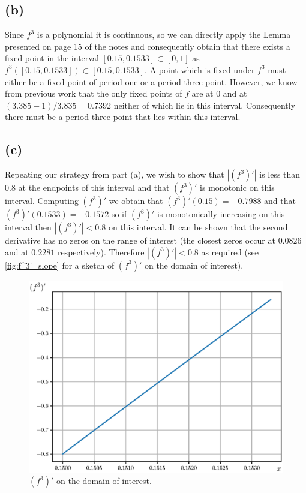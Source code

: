 \documentclass{article}
\begin{document}
\subsection*{(b)}
Since $f^3$ is a polynomial it is continuous, so we can directly apply the Lemma presented on 
page 15 of the notes and consequently obtain that there exists a fixed point in the interval 
$[0.15,0.1533] \subset [0,1]$ as $f^3([0.15,0.1533]) \subset [0.15,0.1533]$. A point which is 
fixed under $f^3$ must either be a fixed point of period one or a period three point. However, 
we know from previous work that the only fixed points of $f$ are at 0 and at $(3.385-1)/3.835 = 0.7392$ 
neither of which lie in this interval. Consequently there must be a period three point that lies 
within this interval.

\subsection*{(c)}
Repeating our strategy from part (a), we wish to show that $|(f^3)'|$ is less than 0.8 at the endpoints 
of this interval and that $(f^3)'$ is monotonic on this interval. Computing $(f^3)'$ we obtain that  
$(f^3)'(0.15) = -0.7988$ and that $(f^3)'(0.1533) = -0.1572$ so if $(f^3)'$ is monotonically 
increasing on this interval then $|(f^3)'| < 0.8$ on this interval. It can be shown that the second derivative has no zeros on the range of interest 
(the closest zeros occur at $0.0826$ and at $0.2281$ respectively). Therefore $|(f^3)'| < 0.8$ 
as required (see \autoref{fig:f^3'_slope} for a sketch of $(f^3)'$ on the domain of interest).

\begin{figure}[H]
    \centering
    \includegraphics[scale = 0.6]{Figure_2.eps}
	\caption{$(f^3)'$ on the domain of interest.}
    \label{fig:f^3'_slope}
\end{figure}
\end{document}
